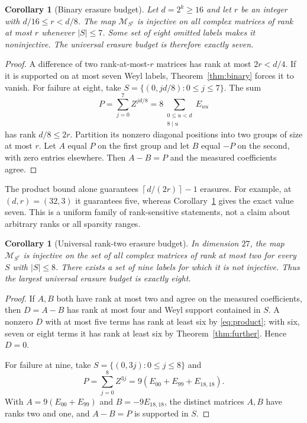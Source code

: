 \documentclass[11pt,a4paper]{article}
\newtheorem{corollary}[theorem]{Corollary}
\theoremstyle{remark}\newtheorem{remark}[theorem]{Remark}
\newcommand{\ceil}[1]{\left\lceil #1\right\rceil}
\begin{document}
\begin{corollary}[Binary erasure budget]\label{cor:binary-erasure}
Let $d=2^k\ge16$ and let $r$ be an integer with $d/16\le r<d/8$. The map $\mathcal M_{S^c}$ is injective on all complex matrices of rank at most $r$ whenever $|S|\le7$. Some set of eight omitted labels makes it noninjective. The universal erasure budget is therefore exactly seven.
\end{corollary}
\begin{proof}
A difference of two rank-at-most-$r$ matrices has rank at most $2r<d/4$. If it is supported on at most seven Weyl labels, Theorem~\ref{thm:binary} forces it to vanish.
For failure at eight, take $S=\{(0,jd/8):0\le j\le7\}$. The sum
\[
 P=\sum_{j=0}^7 Z^{jd/8}=8\sum_{\substack{0\le u<d\\8\mid u}} E_{uu}
\]
has rank $d/8\le2r$. Partition its nonzero diagonal positions into two groups of size at most $r$. Let $A$ equal $P$ on the first group and let $B$ equal $-P$ on the second, with zero entries elsewhere. Then $A-B=P$ and the measured coefficients agree.
\end{proof}

The product bound alone guarantees $\ceil{d/(2r)}-1$ erasures. For example, at $(d,r)=(32,3)$ it guarantees five, whereas Corollary~\ref{cor:binary-erasure} gives the exact value seven. This is a uniform family of rank-sensitive statements, not a claim about arbitrary ranks or all sparsity ranges.

\begin{corollary}[Universal rank-two erasure budget]\label{cor:erasure}
In dimension $27$, the map $\mathcal M_{S^c}$ is injective on the set of all complex matrices of rank at most two for every $S$ with $|S|\le8$. There exists a set of nine labels for which it is not injective. Thus the largest universal erasure budget is exactly eight.
\end{corollary}
\begin{proof}
If $A,B$ both have rank at most two and agree on the measured coefficients, then $D=A-B$ has rank at most four and Weyl support contained in $S$. A nonzero $D$ with at most five terms has rank at least six by \eqref{eq:product}; with six, seven or eight terms it has rank at least six by Theorem~\ref{thm:further}. Hence $D=0$.

For failure at nine, take $S=\{(0,3j):0\le j\le8\}$ and
\[
 P=\sum_{j=0}^8 Z^{3j}=9(E_{00}+E_{99}+E_{18,18}).
\]
With $A=9(E_{00}+E_{99})$ and $B=-9E_{18,18}$, the distinct matrices $A,B$ have ranks two and one, and $A-B=P$ is supported in $S$.
\end{proof}
\end{document}
